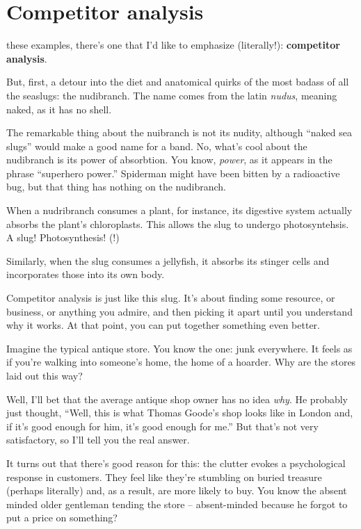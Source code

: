 \section{Competitor analysis}

 these examples, there's one that I'd like to emphasize
(literally!): \textbf{competitor analysis}.

But, first, a detour into the diet and anatomical quirks of the most badass of
all the seaslugs: the nudibranch. The name comes from the latin \textit{nudus},
meaning naked, as it has no shell.

The remarkable thing about the nuibranch is not its nudity, although ``naked sea
slugs'' would make a good name for a band. No, what's cool about the nudibranch
is its power of absorbtion. You know, \textit{power}, as it appears in the
phrase ``superhero power.'' Spiderman might have been bitten by a radioactive
bug, but that thing has nothing on the nudibranch.

When a nudribranch consumes a plant, for instance, its digestive system actually
absorbs the plant's chloroplasts. This allows the slug to undergo
photosyntehsis. A slug! Photosynthesis! (!)

Similarly, when the slug consumes a jellyfish, it absorbs its stinger cells and
incorporates those into its own body.

Competitor analysis is just like this slug. It's about finding some resource, or
business, or anything you admire, and then picking it apart until you understand
why it works. At that point, you can put together something even better.

Imagine the typical antique store. You know the one: junk everywhere. It feels
as if you're walking into someone's home, the home of a hoarder. Why are the
stores laid out this way?

Well, I'll bet that the average antique shop owner has no idea \textit{why}. He
probably just thought, ``Well, this is what Thomas Goode's shop looks like in
London and, if it's good enough for him, it's good enough for me.'' But that's
not very satisfactory, so I'll tell you the real answer. 

It turns out that there's good reason for this: the clutter evokes a
psychological response in customers. They feel like they're stumbling on buried
treasure (perhaps literally) and, as a result, are more likely to buy. You know
the absent minded older gentleman tending the store -- absent-minded because he forgot to put a price
on something?


